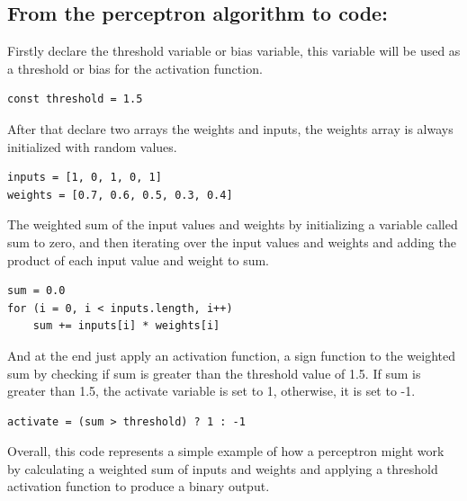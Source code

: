 \documentclass[12pt]{article}
\begin{document}
\subsection{From the perceptron algorithm to code:}
Firstly declare the threshold variable or bias variable,
this variable will be used as a threshold or bias for the activation function.
\begin{verbatim}
const threshold = 1.5
\end{verbatim}
After that declare two arrays the weights and inputs, the weights array is always initialized with random
values.
\begin{verbatim}
inputs = [1, 0, 1, 0, 1]
weights = [0.7, 0.6, 0.5, 0.3, 0.4]
\end{verbatim}
The weighted sum of the input values and weights by initializing a variable called sum to zero,
and then iterating over the input values and weights and adding the product of each input value
and weight to sum.
\begin{verbatim}
sum = 0.0
for (i = 0, i < inputs.length, i++)
    sum += inputs[i] * weights[i]
\end{verbatim}
And at the end just apply an activation function, a sign function to the weighted sum by checking
if sum is greater
than the threshold value of 1.5. If sum is greater than 1.5,
the activate variable is set to 1, otherwise, it is set to -1.
\begin{verbatim}
activate = (sum > threshold) ? 1 : -1
\end{verbatim}
Overall, this code represents a simple example of how a perceptron might work by calculating a
weighted sum of inputs and weights and applying a threshold activation function to produce a
binary output.
\end{document}
